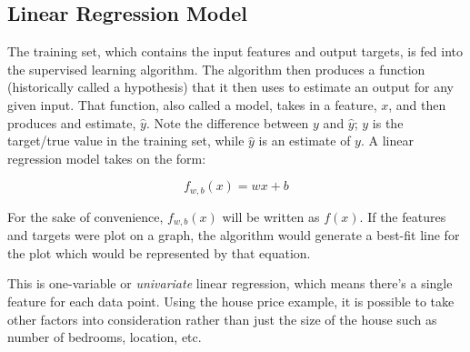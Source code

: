 \documentclass{article}
\begin{document}
\subsection{Linear Regression Model}
The training set, which contains the input features and output targets, is fed into the supervised learning algorithm. The algorithm then produces a function (historically called a hypothesis) that it then uses to estimate an output for any given input. That function, also called a model, takes  in a feature, $x$, and then produces and estimate, $\hat{y}$. Note the difference between $y$ and $\hat{y}$; $y$ is the target/true value in the training set, while $\hat{y}$ is an estimate of $y$. A linear regression model takes on the form:

\[ f_{w,b}(x) = wx + b\]

\noindent For the sake of convenience, $f_{w,b}(x)$ will be written as $f(x)$. If the features and targets were plot on a graph, the algorithm would generate a best-fit line for the plot which would be represented by that equation.
\vspace{5mm}


\noindent This is one-variable or \textit{univariate} linear regression, which means there's a single feature for each data point. Using the house price example, it is possible to take other factors into consideration rather than just the size of the house such as number of bedrooms, location, etc.
\end{document}
